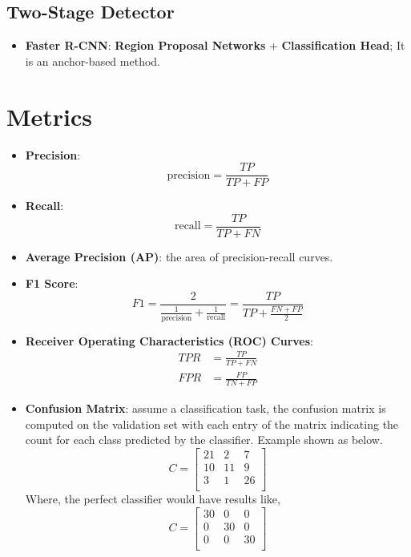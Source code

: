 \documentclass[a4paper]{article}
\begin{document}
\subsection{Two-Stage Detector}

\begin{itemize}
	\item \textbf{Faster R-CNN}: \textbf{Region Proposal Networks} + \textbf{Classification Head}; It is an anchor-based method.
\end{itemize}

\section{Metrics}

\begin{itemize}
	\item \textbf{Precision}:
	\begin{equation}
		\text{precision} = \frac{TP}{TP + FP}
	\end{equation}
	\item \textbf{Recall}:
	\begin{equation}
		\text{recall} = \frac{TP}{TP + FN}
	\end{equation}
	\item \textbf{Average Precision (AP)}: the area of precision-recall curves.
	\item \textbf{F1 Score}:
	\begin{equation}
		F1 = \frac{2}{\frac{1}{\text{precision}} + \frac{1}{\text{recall}}} = \frac{TP}{TP + \frac{FN + FP}{2}}
	\end{equation}
	\item \textbf{Receiver Operating Characteristics (ROC) Curves}:
	\begin{align}
		TPR &= \frac{TP}{TP + FN} \\
		FPR &= \frac{FP}{TN + FP}
	\end{align}
	\item \textbf{Confusion Matrix}: assume a classification task, the confusion matrix is computed on the validation set with each entry of the matrix indicating the count for each class predicted by the classifier. Example shown as below.
	\begin{equation}
		C = 
		\begin{bmatrix}
			21 & 2 & 7 \\
			10 & 11 & 9 \\
			3 & 1 & 26 \\
		\end{bmatrix}
	\end{equation}
	Where, the perfect classifier would have results like,
	\begin{equation}
		C = 
		\begin{bmatrix}
			30 & 0 & 0 \\
			0 & 30 & 0 \\
			0 & 0 & 30 \\
		\end{bmatrix}
	\end{equation}
\end{itemize}
\end{document}
